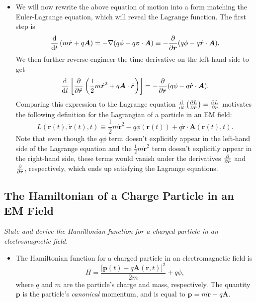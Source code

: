 \documentclass[11pt, a4paper]{article}
\renewcommand{\vec}[1]{\bm{#1}} %
\renewcommand{\r}{\vec{r}}
\newcommand{\A}{\vec{A}} %
\renewcommand{\grad}{\nabla}
\begin{document}
\begin{itemize}
    \item We will now rewrite the above equation of motion into a form matching the Euler-Lagrange equation, which will reveal the Lagrange function. The first step is
    \begin{equation*}
        \dv{t} \left( m \dot{\vec{r}} + q\A \right) = - \grad ( q \phi - q \vec{v}\cdot \A ) \equiv - \pdv{\r} ( q \phi - q \dot{\vec{r}} \cdot \A ).
    \end{equation*}
    We then further reverse-engineer the time derivative on the left-hand side to get
    \begin{equation*}
        \dv{t} \left[ \pdv{ \dot{\vec{r}}} \left( \frac{1}{2} m \dot{\vec{r}}^{2} + q \A \cdot \dot{\vec{r}} \right) \right] = - \pdv{\r} ( q \phi - q \dot{\vec{r}} \cdot \A ).
    \end{equation*}
    Comparing this expression to the Lagrange equation $ \dv{t} \left(\pdv{L}{\dot{\r}} \right) = \pdv{L}{\r} $ motivates the following definition for the Lagrangian of a particle in an EM field:
    \begin{equation*}
        L(\r(t), \dot{\vec{r}}(t), t) \equiv \frac{1}{2}m \dot{\vec{r}}^{2} - q \phi(\r(t)) + q \dot{\vec{r}} \cdot \A(\r(t), t).
    \end{equation*}
    Note that even though the $ q\phi $ term doesn't explicitly appear in the left-hand side of the Lagrange equation and the $ \frac{1}{2}m \dot{\vec{r}}^{2} $ term doesn't explicitly appear in the right-hand side, these terms would vanish under the derivatives $ \pdv{\dot{\vec{r}}} $ and $ \pdv{\r} $, respectively, which ends up satisfying the Lagrange equations.

    
\end{itemize}

    
\subsection{The Hamiltonian of a Charge Particle in an EM Field} \label{ss:hamilton}
\textit{State and derive the Hamiltonian function for a charged particle in an electromagnetic field.}

\begin{itemize}
    \item The Hamiltonian function for a charged particle in an electromagnetic field is
    \begin{equation*}
        H = \frac{\big[\vec{p}(t) - q \A(\r, t)\big]^{2}}{2m} + q \phi,
    \end{equation*}
    where $ q $ and $ m $ are the particle's charge and mass, respectively. The quantity $ \vec{p} $ is the particle's \textit{canonical} momentum, and is equal to $ \vec{p} = m \dot{\vec{r}} + q \A $.
    
\end{itemize}
\end{document}
